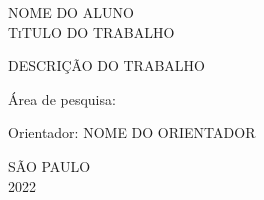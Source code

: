 \begin{titlepage}
\vfill
\begin{center}

    {\large NOME DO ALUNO\\}
    \vspace{2cm}
    {\Large \textsc{TiTULO DO TRABALHO}\\}
    \vspace{1cm}
    \hspace{.45\linewidth}
    \begin{minipage}{.50\linewidth}

            DESCRIÇÃO DO TRABALHO
            

            \vspace{0.5 cm}

            Área de pesquisa: 

            \vspace{0.5 cm}

            Orientador: NOME DO ORIENTADOR
    
    \end{minipage}

    \vspace{2cm}
    \vfill
    {\large SÃO PAULO\\ 2022}
\end{center}

\end{titlepage}
